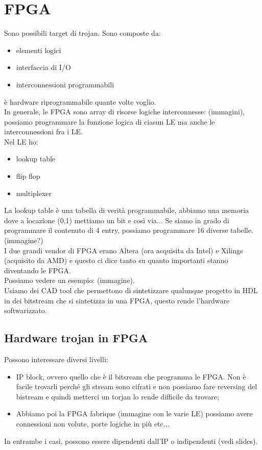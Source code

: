 \documentclass[oneside, 12pt]{extbook}
\begin{document}
\section{FPGA}
Sono possibili target di trojan. Sono composte da:
\begin{itemize}
	\item elementi logici
	\item interfaccia di I/O
	\item interconnessioni programmabili
\end{itemize}
è hardware riprogrammabile quante volte voglio.\\In generale, le FPGA sono array di risorse logiche interconnesse: (immagini), possiamo programmare la funzione logica di ciasun LE ma anche le interconnessioni fra i LE.\\Nel LE ho:
\begin{itemize}
	\item lookup table
	\item flip flop
	\item multiplexer
\end{itemize}
La lookup table è una tabella di verità programmabile, abbiamo una memoria dove a locazione (0,1) mettiamo un bit e così via... Se siamo in grado di programmare il contenuto di 4 entry, possiamo programmare 16 diverse tabelle. (immagine?)\\I due grandi vendor di FPGA erano Altera (ora acquisita da Intel) e Xilings (acquisito da AMD) e questo ci dice tanto su quanto importanti stanno diventando le FPGA.\\Possiamo vedere un esempio: (immagine).\\Usiamo dei CAD tool che permettono di sintetizzare qualunque progetto in HDL in dei bitstream che si sintetizza in una FPGA, questo rende l'hardware softwarizzato.
\subsection{Hardware trojan in FPGA}
Possono interessare diversi livelli:
\begin{itemize}
	\item IP block, ovvero quello che è il bitsream che programma le FPGA. Non è facile trovarli perché gli stream sono cifrati e non possiamo fare reversing del bistream e quindi metterci un torjan lo rende difficile da trovare;
	\item Abbiamo poi la FPGA fabrique (immagine con le varie LE) possiamo avere connessioni non volute, porte logiche in più etc...
\end{itemize}
In entrambe i casi, possono essere dipendenti dall'IP o indipendenti (vedi slides).
\end{document}
